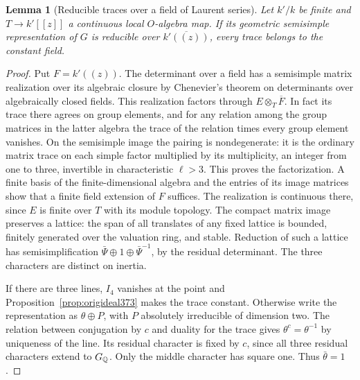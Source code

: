 \documentclass[a4paper,11pt]{article}
\newtheorem{lemma}[proposition]{Lemma}
\theoremstyle{definition}
\theoremstyle{remark}
\numberwithin{equation}{section}
\begin{document}
\begin{lemma}[Reducible traces over a field of Laurent series]
\label{lem:curvedescent378}
Let \(k'/k\) be finite and \(T\to k'[[z]]\) a continuous
local \(O\)-algebra map. If its geometric semisimple
representation of \(G\) is reducible over
\(\overline{k'((z))}\), every trace belongs to the constant field.
\end{lemma}
\begin{proof}
Put \(F=k'((z))\). The determinant over a field has a
semisimple matrix realization over its algebraic closure
by Chenevier's theorem on determinants over algebraically
closed fields. This realization factors through
\(E\otimes_T\overline F\). In fact its trace there agrees
on group elements, and for any relation among the group
matrices in the latter algebra the trace of the relation
times every group element vanishes. On the semisimple
image the pairing is nondegenerate: it is the ordinary
matrix trace on each simple factor multiplied by its
multiplicity, an integer from one to three, invertible in
characteristic \(\ell>3\). This proves the factorization.
A finite basis of the finite-dimensional algebra and the
entries of its image matrices show that a finite field
extension of \(F\) suffices. The realization is continuous
there, since \(E\) is finite over \(T\) with its module
topology. The compact matrix image preserves a lattice:
the span of all translates of any fixed lattice is bounded,
finitely generated over the valuation ring, and stable.
Reduction of such a lattice has semisimplification
\(\bar\Psi\oplus1\oplus\bar\Psi^{-1}\), by the residual
determinant. The three characters are distinct on inertia.
~\cite{VIII-VI-chenevier364}

If there are three lines, \(I_4\) vanishes at the point and
Proposition~\ref{prop:origideal373} makes the trace constant.
Otherwise write the representation as \(\theta\oplus P\),
with \(P\) absolutely irreducible of dimension two.
The relation between conjugation by \(c\) and duality for
the trace gives \(\theta^c=\theta^{-1}\) by uniqueness of
the line. Its residual character is fixed by \(c\), since
all three residual characters extend to \(G_\mathbb Q\). Only
the middle character has square one. Thus \(\bar\theta=1\).


\end{proof}
\end{document}
